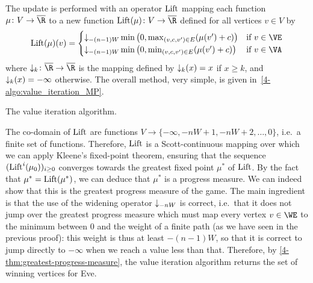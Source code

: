 The update is performed with an operator $\textrm{Lift}$ mapping each function
$\mu\colon V\to \Rbar$ to a new function $\Lift(\mu)\colon V\to \Rbar$
defined for all vertices $v\in V$ by
\[\Lift(\mu)(v) =
  \begin{cases}
    \downward{-(n-1)W}\min\big(0,\max_{(v,c,v')\in E} (\mu(v')+c)\big) & \text{if } v\in
    \VE\\
    \downward{-(n-1)W}\min\big(0,\min_{(v,c,v')\in E} (\mu(v')+c)\big) & \text{if } v\in \VA
  \end{cases}\] where $\downward{k}\colon \Rbar\to \Rbar$ is the
mapping defined by $\mathop{\downarrow_{k}}(x) = x$ if $x\geq k$, and
$\mathop{\downarrow_{k}}(x) = -\infty$ otherwise. The overall method, very
simple, is given in~\cref{4-algo:value_iteration_MP}. 


\begin{algorithm}[ht]

     
\lRepeat{$\mu = \Lift(\mu)$}{
$\mu \leftarrow \Lift(\mu)$}

\caption{The value iteration algorithm.}
\label{4-algo:value_iteration_MP}
\end{algorithm}


The co-domain of $\textrm{Lift}$ are functions
$V\to \{-\infty,-nW+1,-nW+2,\ldots,0\}$, i.e.~a finite set of
functions. Therefore, $\textrm{Lift}$ is a Scott-continuous mapping over which
we can apply Kleene's fixed-point theorem, ensuring that the sequence
$(\textrm{Lift}^i(\mu_0))_{i\geq 0}$ converges towards the greatest fixed
point $\mu^*$ of $\textrm{Lift}$. By the fact that $\mu^*=\textrm{Lift}(\mu^*)$, we
can deduce that $\mu^*$ is a progress measure. We can indeed show that
this is the greatest progress measure of the game. The main ingredient
is that the use of the widening operator $\mathop{\downarrow_{-nW}}$ is
correct, i.e.~that it does not jump over the greatest progress measure
which must map every vertex $v\in\WE$ to the minimum between $0$ and
the weight of a finite path (as we have seen in the previous proof):
this weight is thus at least $-(n-1)W$, so that it is correct to
jump directly to $-\infty$ when we reach a value less than
that. Therefore, by \cref{4-thm:greatest-progress-measure}, the value
iteration algorithm returns the set of winning vertices for Eve.


